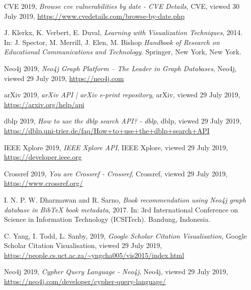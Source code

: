 \documentclass[twocolumn]{article}
\begin{document}
\begin{thebibliography}{9}

CVE 2019,
\textit{Browse cve vulnerabilities by date - CVE Details},
CVE, viewed 30 July 2019,
\url{https://www.cvedetails.com/browse-by-date.php}

J. Klerkx, K. Verbert, E. Duval,
\textit{Learning with Visualization Techniques}, 2014.
In: J. Spector, M. Merrill, J. Elen, M. Bishop 
\textit{Handbook of Research on Educational Communications and Technology}. 
Springer, New York, New York.

Neo4j 2019, 
\textit{Neo4j Graph Platform – The Leader in Graph Databases}, 
Neo4j, viewed 29 July 2019, 
\url{https://neo4j.com}

arXiv 2019,
\textit{arXiv API | arXiv e-print repository},
arXiv, viewed 29 July 2019,
\url{https://arxiv.org/help/api}

dblp 2019,
\textit{How to use the dblp search API? - dblp},
dblp, viewed 29 July 2019,
\url{https://dblp.uni-trier.de/faq/How+to+use+the+dblp+search+API}

IEEE Xplore 2019,
\textit{IEEE Xplore API},
IEEE Xplore, viewed 29 July 2019,
\url{https://developer.ieee.org}

Crossref 2019,
\textit{You are Crossref - Crossref},
Crossref, viewed 29 July 2019,
\url{https://www.crossref.org/}

I. N. P. W. Dharmawan and R. Sarno, 
\textit{Book recommendation using Neo4j graph database in BibTeX book metadata}, 2017.
In: 3rd International Conference on Science in Information Technology (ICSITech). 
Bandung, Indonesia.

C. Yang, I. Todd, L. Sanby, 2019,
\textit{Google Scholar Citation Visualisation},
Google Scholar Citation Visualisation, viewed 29 July 2019,
\url{https://people.cs.uct.ac.za/~yngcha005/vis2015/index.html}

Neo4j 2019,
\textit{Cypher Query Language - Neo4j},
Neo4j, viewed 29 July 2019,
\url{https://neo4j.com/developer/cypher-query-language/}

\end{thebibliography}
\end{document}
